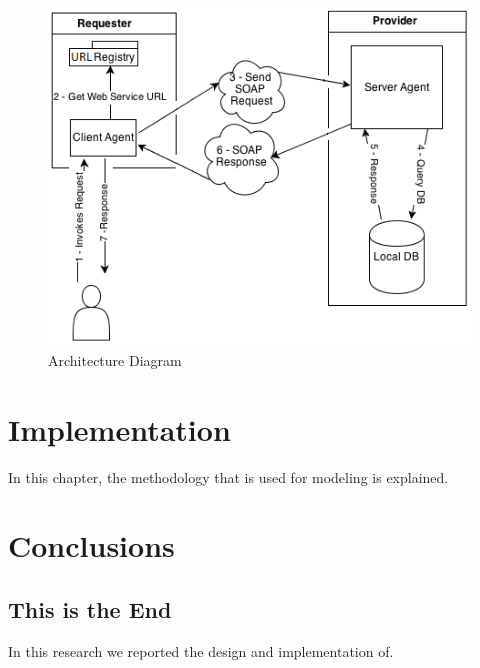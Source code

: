 \documentclass[12pt,a4paper,oneside]{book}
\begin{document}
\begin{figure}[!htp]
  \centering
  \includegraphics[width=12cm]{architecture.png}
  \caption{Architecture Diagram}
  \label{fig:architecture}
\end{figure}


\chapter{Implementation}\label{ch-implement}
In this chapter, the methodology that is used for modeling is explained.


\chapter{Conclusions}
\label{ch:Conclusions}

\section{This is the End}
\label{sec:This_is_the_end}
%
In this research we reported the design and implementation of.
\end{document}
